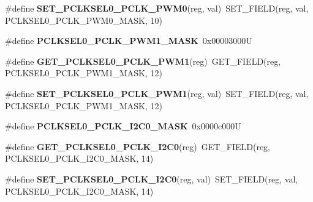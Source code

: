 \begin{DoxyCompactItemize}
\item 
\mbox{\label{group__lpc24xx__regs_ga90f7f48846bb999288907bbbd4650503}} 
\#define {\bfseries S\+E\+T\+\_\+\+P\+C\+L\+K\+S\+E\+L0\+\_\+\+P\+C\+L\+K\+\_\+\+P\+W\+M0}(reg,  val)~S\+E\+T\+\_\+\+F\+I\+E\+LD(reg, val, P\+C\+L\+K\+S\+E\+L0\+\_\+\+P\+C\+L\+K\+\_\+\+P\+W\+M0\+\_\+\+M\+A\+SK, 10)
\item 
\mbox{\label{group__lpc24xx__regs_ga0bd0697a6c5f2db7d26c5f8d8a860535}} 
\#define {\bfseries P\+C\+L\+K\+S\+E\+L0\+\_\+\+P\+C\+L\+K\+\_\+\+P\+W\+M1\+\_\+\+M\+A\+SK}~0x00003000U
\item 
\mbox{\label{group__lpc24xx__regs_gaa9795670b384dc31b0c3c1b2e64427bf}} 
\#define {\bfseries G\+E\+T\+\_\+\+P\+C\+L\+K\+S\+E\+L0\+\_\+\+P\+C\+L\+K\+\_\+\+P\+W\+M1}(reg)~G\+E\+T\+\_\+\+F\+I\+E\+LD(reg, P\+C\+L\+K\+S\+E\+L0\+\_\+\+P\+C\+L\+K\+\_\+\+P\+W\+M1\+\_\+\+M\+A\+SK, 12)
\item 
\mbox{\label{group__lpc24xx__regs_gaad8c5de48d4004b80213cab93f196115}} 
\#define {\bfseries S\+E\+T\+\_\+\+P\+C\+L\+K\+S\+E\+L0\+\_\+\+P\+C\+L\+K\+\_\+\+P\+W\+M1}(reg,  val)~S\+E\+T\+\_\+\+F\+I\+E\+LD(reg, val, P\+C\+L\+K\+S\+E\+L0\+\_\+\+P\+C\+L\+K\+\_\+\+P\+W\+M1\+\_\+\+M\+A\+SK, 12)
\item 
\mbox{\label{group__lpc24xx__regs_gaf4d19c9ceb90c09dd0a5ef611c5f7312}} 
\#define {\bfseries P\+C\+L\+K\+S\+E\+L0\+\_\+\+P\+C\+L\+K\+\_\+\+I2\+C0\+\_\+\+M\+A\+SK}~0x0000c000U
\item 
\mbox{\label{group__lpc24xx__regs_gaa41873a58132073ff75c345e7dc92bca}} 
\#define {\bfseries G\+E\+T\+\_\+\+P\+C\+L\+K\+S\+E\+L0\+\_\+\+P\+C\+L\+K\+\_\+\+I2\+C0}(reg)~G\+E\+T\+\_\+\+F\+I\+E\+LD(reg, P\+C\+L\+K\+S\+E\+L0\+\_\+\+P\+C\+L\+K\+\_\+\+I2\+C0\+\_\+\+M\+A\+SK, 14)
\item 
\mbox{\label{group__lpc24xx__regs_gafdc0feec252c15d94d1acd4ab8d8e067}} 
\#define {\bfseries S\+E\+T\+\_\+\+P\+C\+L\+K\+S\+E\+L0\+\_\+\+P\+C\+L\+K\+\_\+\+I2\+C0}(reg,  val)~S\+E\+T\+\_\+\+F\+I\+E\+LD(reg, val, P\+C\+L\+K\+S\+E\+L0\+\_\+\+P\+C\+L\+K\+\_\+\+I2\+C0\+\_\+\+M\+A\+SK, 14)
\item 

\end{DoxyCompactItemize}
